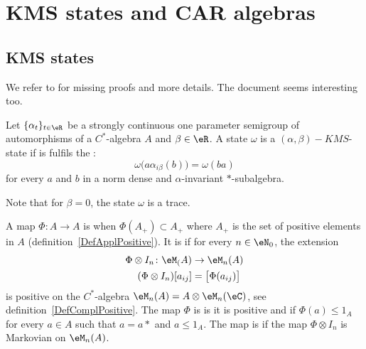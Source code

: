 
\section{KMS states and CAR algebras}

\subsection{KMS states}

We refer to \cite{CirpianiDirichlet} for missing proofs and more details. The document \cite{VaesLocCompQG} seems interesting too.

\begin{definition}
	Let $\{ \alpha_t\}_{t\in\eR}$ be a strongly continuous one parameter semigroup of automorphisms of a $C^*$-algebra $A$ and $\beta\in\eR$. A state $\omega$ is a $(\alpha,\beta)-KMS$-state if is fulfils the :
	\begin{equation}		\label{EqKMScondPourOmega}
		\omega\big( a\alpha_{i\beta}(b) \big)=\omega(ba)
	\end{equation}
	for every $a$ and $b$ in a norm dense and $\alpha$-invariant $*$-subalgebra.
\end{definition}
Note that for $\beta=0$, the state $\omega$ is a trace.

A map $\Phi\colon A\to A$ is  when $\Phi(A_+)\subset A_+$ where $A_+$ is the set of positive elements in $A$ (definition~\ref{DefApplPositive}). It is  if for every $n\in\eN_0$, the extension
\begin{equation}
	\begin{aligned}
		\Phi\otimes I_n\colon \eM_(A)&\to \eM_n(A) \\
		(\Phi\otimes I_n)[a_{ij}]&=\big[ \Phi(a_{ij}) \big]
	\end{aligned}
\end{equation}
is positive on the $C^*$-algebra $\eM_n(A)=A\otimes\eM_n(\eC)$, see definition~\ref{DefComplPositive}. The map $\Phi$ is  is it is positive and if $\Phi(a)\leq 1_A$ for every $a\in A$ such that $a=a*$ and $a\leq 1_A$. The map is  if the map $\Phi\otimes I_n$ is Markovian on $\eM_n(A)$.

